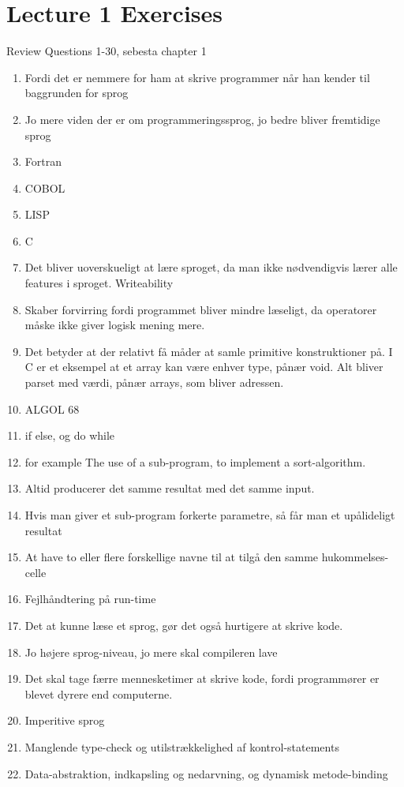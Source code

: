 \section{Lecture 1 Exercises}

Review Questions 1-30, sebesta chapter 1
\begin{enumerate}
	\item Fordi det er nemmere for ham at skrive programmer når han kender til baggrunden for sprog
	\item Jo mere viden der er om programmeringssprog, jo bedre bliver fremtidige sprog
	\item Fortran
	\item COBOL
	\item LISP
	\item C
	\item Det bliver uoverskueligt at lære sproget, da man ikke nødvendigvis lærer alle features i sproget. Writeability
	\item Skaber forvirring fordi programmet bliver mindre læseligt, da operatorer måske ikke giver logisk mening mere.
	\item Det betyder at der relativt få måder at samle primitive konstruktioner på. I C er et eksempel at et array kan være enhver type, pånær void. Alt bliver parset med værdi, pånær arrays, som bliver adressen. 
	\item ALGOL 68
	\item if else, og do while
	\item for example The use of a sub-program, to implement a sort-algorithm.
	\item Altid producerer det samme resultat med det samme input. 
	\item Hvis man giver et sub-program forkerte parametre, så får man et upålideligt resultat
	\item At have to eller flere forskellige navne til at tilgå den samme hukommelses-celle
	\item Fejlhåndtering på run-time
	\item Det at kunne læse et sprog, gør det også hurtigere at skrive kode.
	\item Jo højere sprog-niveau, jo mere skal compileren lave
	\item Det skal tage færre mennesketimer at skrive kode, fordi programmører er blevet dyrere end computerne. 
	\item Imperitive sprog
	\item Manglende type-check og utilstrækkelighed af kontrol-statements 
	\item Data-abstraktion, indkapsling og nedarvning, og dynamisk metode-binding

\end{enumerate}
